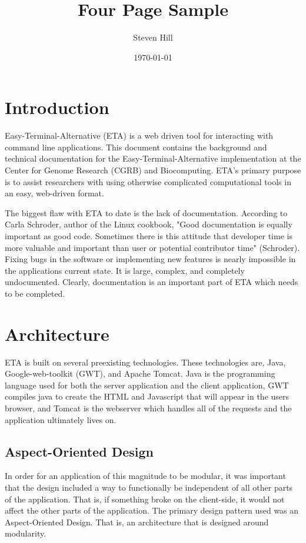 \documentclass[a4paper,12pt]{article}
\author{Steven Hill}
\title{Four Page Sample}
\date{\today}
\begin{document}
\maketitle
\section{Introduction}
 Easy-Terminal-Alternative (ETA) is a web driven tool for interacting with command line applications. This document contains the background and technical documentation for the Easy-Terminal-Alternative implementation at the Center for Genome Research (CGRB) and Biocomputing. ETA's primary purpose is to assist researchers with using otherwise complicated computational tools in an easy, web-driven format.
 
 The biggest flaw with ETA to date is the lack of documentation. According to Carla Schroder, author of the 
Linux cookbook, "Good documentation is equally important as good code. Sometimes there is this attitude that developer time is more valuable and important than user or potential contributor time" (Schroder). Fixing bugs in the software or implementing new features is nearly impossible in the applications current state. It is large, complex, and completely undocumented. Clearly, documentation is an important part of ETA which needs to be completed.

 
\section{Architecture}

ETA is built on several preexisting technologies. These technologies are, Java, Google-web-toolkit (GWT), and Apache Tomcat. Java is the programming language used for both the server application and the client application, GWT compiles java  to create the HTML and Javascript that will appear in the users browser, and Tomcat is the webserver which handles all of the requests and the application ultimately lives on.

\subsection{Aspect-Oriented Design}
In order for an application of this magnitude to be modular, it was important that the design included a way to functionally be independent of all other parts of the application. That is, if something broke on the client-side, it would not affect the other parts of the application. The primary design pattern used was an Aspect-Oriented Design. That is, an architecture that is designed around modularity. 
\end{document}
